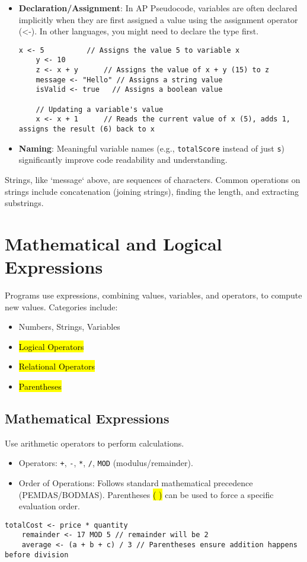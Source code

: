 \documentclass[11pt,oneside]{book}
\newcommand{\hlc}[2][hlyellow]{\sethlcolor{#1}\hl{#2}}
\begin{document}
\begin{itemize}
    \item \textbf{Declaration/Assignment}: In AP Pseudocode, variables are often declared implicitly when they are first assigned a value using the assignment operator (<-). In other languages, you might need to declare the type first.
    \begin{lstlisting}[language={}, label={lst:assignment_detail}, caption={AP Pseudocode: Assignment Examples}]
    x <- 5          // Assigns the value 5 to variable x
    y <- 10
    z <- x + y      // Assigns the value of x + y (15) to z
    message <- "Hello" // Assigns a string value
    isValid <- true   // Assigns a boolean value

    // Updating a variable's value
    x <- x + 1      // Reads the current value of x (5), adds 1, assigns the result (6) back to x
    \end{lstlisting}
    \item \textbf{Naming}: Meaningful variable names (e.g., \texttt{totalScore} instead of just \texttt{s}) significantly improve code readability and understanding.
\end{itemize}
Strings, like `message` above, are sequences of characters. Common operations on strings include concatenation (joining strings), finding the length, and extracting substrings.

\section{Mathematical and Logical Expressions}
\label{sec:expressions}
Programs use expressions, combining values, variables, and operators, to compute new values. Categories include:
\begin{itemize}
    \item Numbers, Strings, Variables
    \item \hlc[hlred]{Logical Operators}
    \item \hlc[hlyellow]{Relational Operators}
    \item \hlc[hlblue]{Parentheses}
\end{itemize}

\subsection*{Mathematical Expressions}
Use arithmetic operators to perform calculations.
\begin{itemize}
    \item Operators: \texttt{+}, \texttt{-}, \texttt{*}, \texttt{/}, \texttt{MOD} (modulus/remainder).
    \item Order of Operations: Follows standard mathematical precedence (PEMDAS/BODMAS). Parentheses \hlc[hlblue]{( )} can be used to force a specific evaluation order.
\end{itemize}
\begin{lstlisting}[language={}, label={lst:math_expr_detail}, caption={AP Pseudocode: Math Expressions}]
    totalCost <- price * quantity
    remainder <- 17 MOD 5 // remainder will be 2
    average <- (a + b + c) / 3 // Parentheses ensure addition happens before division
\end{lstlisting}
\end{document}
